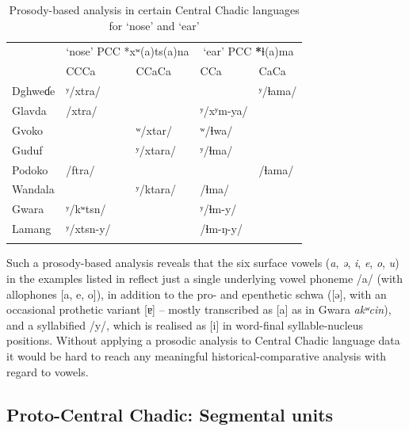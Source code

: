 \documentclass[output=paper]{langscibook}
\begin{document}
\begin{table}
\caption{Prosody-based analysis in certain Central Chadic languages for ‘nose’ and ‘ear’}
\label{extab:wolff:9}
\begin{tabularx}{\textwidth}{XlXll}
\lsptoprule
 & \multicolumn{2}{l}{‘nose’ PCC *xʷ(a)ts(a)na} & \multicolumn{2}{c}{‘ear’ PCC \textbf{*}ɬ(a)ma}\\
 \cmidrule{2-5}
& CCCa & CCaCa & CCa & CaCa\\
\midrule
Dghweɗe & ʸ/xtra/ &  &  & ʸ/ɬama/\\
Glavda & /xtra/ &  & ʸ/xʸm-ya/ & \\
Gvoko &  & ʷ/xtar/ & ʷ/ɬwa/ & \\
Guduf &  & ʸ/xtara/ & ʸ/ɬma/ & \\
Podoko & /ftra/ &  &  & /ɬama/\\
Wandala &  & ʸ/ktara/ & /ɬma/ & \\
Gwara & ʸ/kʷtsn/ &  & ʸ/ɬm-y/ & \\
Lamang & ʸ/xtsn-y/ &  & /ɬm-ŋ-y/ & \\
\lspbottomrule
\end{tabularx}
\end{table}

Such a prosody-based analysis reveals that the six surface vowels (\textit{a}, \textit{ə}, \textit{i}, \textit{e}, \textit{o}, \textit{u}) in the examples listed in  reflect just a single underlying vowel phoneme /a/ (with allophones [a, e, o]), in addition to the pro- and epenthetic schwa ([ə], with an occasional prothetic variant [ɐ] – mostly transcribed as [a] as in Gwara \textit{akʷcin}), and a syllabified /y/, which is realised as [i] in word-final syllable-nucleus positions. Without applying a prosodic analysis to Central Chadic language data it would be hard to reach any meaningful historical-comparative analysis with regard to vowels.

\subsection{Proto-Central Chadic: Segmental units}
\label{sec:Wolff:2.1}
\end{document}
